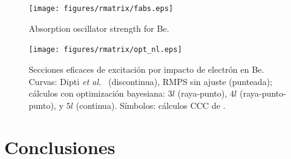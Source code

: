 \begin{figure}
\centering
\texttt{[image: figures/rmatrix/fabs.eps]} 
\caption{Absorption oscillator strength for Be.}
\label{fig:fabs}
\end{figure}



\begin{figure}
\centering
\texttt{[image: figures/rmatrix/opt\_nl.eps]} 
\caption{Secciones eficaces de excitación por impacto de electrón en Be.
Curvas: Dipti \textit{et al.}~\cite{Dipti:19} (discontinua), RMPS sin 
ajuste (punteada); cálculos con optimización bayesiana: 
$3l$ (raya-punto), 
$4l$ (raya-punto-punto), y
$5l$ (continua). 
Símbolos: cálculos CCC de \cite{Fursa:97}.}
\end{figure}

\newpage
\section{Conclusiones}
